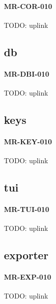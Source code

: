 \paragraph{MR-COR-010}
TODO: uplink

\subsection{db}
\paragraph{MR-DBI-010}
TODO: uplink

\subsection{keys}
\paragraph{MR-KEY-010}
TODO: uplink

\subsection{tui}
\paragraph{MR-TUI-010}
TODO: uplink

\subsection{exporter}
\paragraph{MR-EXP-010}
TODO: uplink
